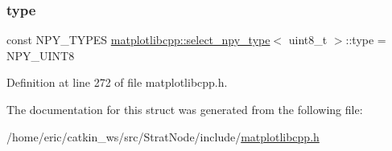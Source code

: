 \subsubsection{\texorpdfstring{type}{type}}
{\footnotesize\ttfamily const N\+P\+Y\+\_\+\+T\+Y\+P\+ES \mbox{\hyperlink{structmatplotlibcpp_1_1select__npy__type}{matplotlibcpp\+::select\+\_\+npy\+\_\+type}}$<$ uint8\+\_\+t $>$\+::type = N\+P\+Y\+\_\+\+U\+I\+N\+T8\hspace{0.3cm}{\ttfamily [static]}}



Definition at line 272 of file matplotlibcpp.\+h.



The documentation for this struct was generated from the following file\+:\begin{DoxyCompactItemize}
\item 
/home/eric/catkin\+\_\+ws/src/\+Strat\+Node/include/\mbox{\hyperlink{matplotlibcpp_8h}{matplotlibcpp.\+h}}\end{DoxyCompactItemize}
